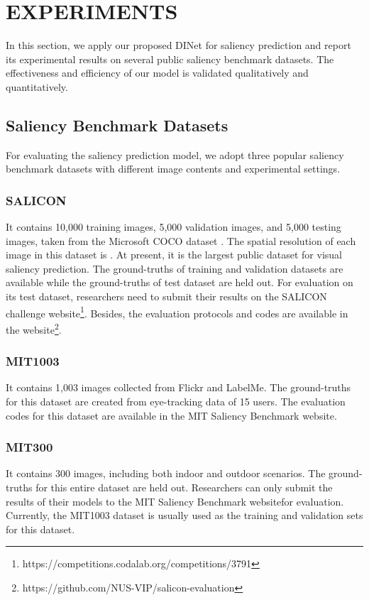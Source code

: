 \section{EXPERIMENTS}
\label{sec:exp}


In this section, we apply our proposed DINet for saliency prediction and report its experimental results on several public saliency benchmark datasets. The effectiveness and efficiency of our model is validated qualitatively and quantitatively. 

\subsection{Saliency Benchmark Datasets} 
For evaluating the saliency prediction model, we adopt three popular saliency benchmark datasets with different image contents and experimental settings.

\subsubsection{SALICON \cite{jiang2015salicon}}
It contains 10,000 training images, 5,000 validation images, and 5,000 testing images, taken from the Microsoft COCO dataset \cite{lin2014microsoft}. The spatial resolution of each image in this dataset is . At present, it is the largest public dataset for visual saliency prediction. The ground-truths of training and validation datasets are available while the ground-truths of test dataset are held out. For evaluation on its test dataset, researchers need to submit their results on the SALICON challenge website\footnote{https://competitions.codalab.org/competitions/3791}. Besides, the evaluation protocols and codes are available in the website\footnote{https://github.com/NUS-VIP/salicon-evaluation}.


\subsubsection{MIT1003 \cite{judd2009learning}}
It contains 1,003 images collected from Flickr and LabelMe. The ground-truths for this dataset are created from eye-tracking data of 15 users. The evaluation codes for this dataset are available in the MIT Saliency Benchmark website\footnotemark.

\subsubsection{MIT300 \cite{Judd_2012}}
It contains 300 images, including both indoor and outdoor scenarios. The ground-truths for this entire dataset are held out. Researchers can only submit the results of their models to the MIT Saliency Benchmark website\footnotemark[\value{footnote}] for evaluation. Currently, the MIT1003 dataset is usually used as the training and validation sets for this dataset.


